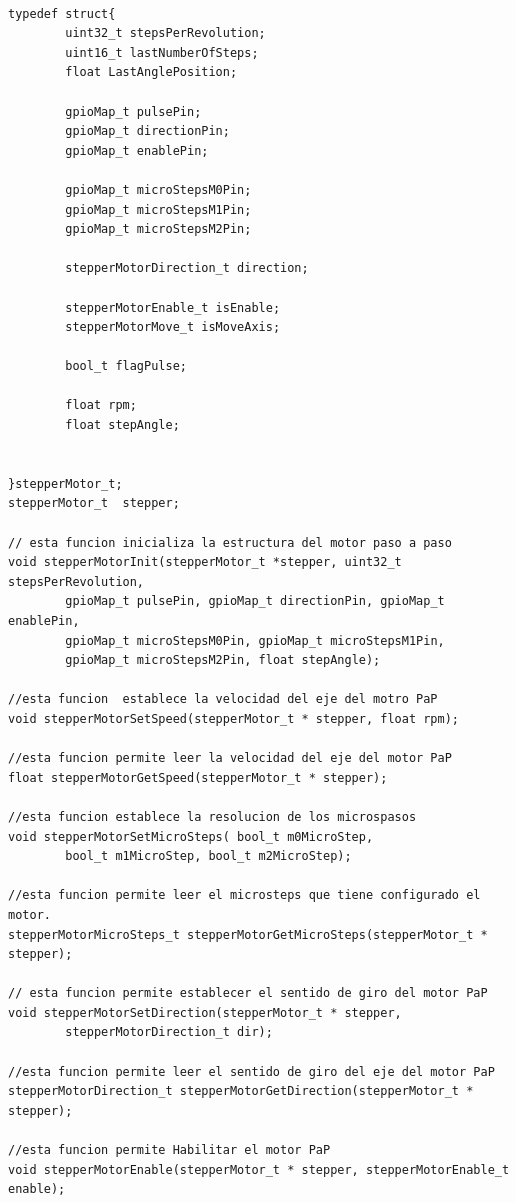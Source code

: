 \begin{lstlisting}[label=cod:vControl,caption=Porción de código del archivo de cabecera con la interfaz pública de la clase StepperMotor.]  % Start your code-block

typedef struct{
		uint32_t stepsPerRevolution;
		uint16_t lastNumberOfSteps;
		float LastAnglePosition;

		gpioMap_t pulsePin;
		gpioMap_t directionPin;
		gpioMap_t enablePin;

		gpioMap_t microStepsM0Pin;
		gpioMap_t microStepsM1Pin;
		gpioMap_t microStepsM2Pin;

		stepperMotorDirection_t direction;

		stepperMotorEnable_t isEnable;
		stepperMotorMove_t isMoveAxis;

		bool_t flagPulse;

		float rpm;
		float stepAngle;


}stepperMotor_t;
stepperMotor_t  stepper;

// esta funcion inicializa la estructura del motor paso a paso
void stepperMotorInit(stepperMotor_t *stepper, uint32_t stepsPerRevolution,
		gpioMap_t pulsePin, gpioMap_t directionPin, gpioMap_t enablePin,
		gpioMap_t microStepsM0Pin, gpioMap_t microStepsM1Pin,
		gpioMap_t microStepsM2Pin, float stepAngle);
		
//esta funcion  establece la velocidad del eje del motro PaP
void stepperMotorSetSpeed(stepperMotor_t * stepper, float rpm);

//esta funcion permite leer la velocidad del eje del motor PaP
float stepperMotorGetSpeed(stepperMotor_t * stepper);

//esta funcion establece la resolucion de los microspasos
void stepperMotorSetMicroSteps( bool_t m0MicroStep,
		bool_t m1MicroStep, bool_t m2MicroStep);

//esta funcion permite leer el microsteps que tiene configurado el motor.
stepperMotorMicroSteps_t stepperMotorGetMicroSteps(stepperMotor_t * stepper);

// esta funcion permite establecer el sentido de giro del motor PaP
void stepperMotorSetDirection(stepperMotor_t * stepper,
		stepperMotorDirection_t dir);

//esta funcion permite leer el sentido de giro del eje del motor PaP
stepperMotorDirection_t stepperMotorGetDirection(stepperMotor_t * stepper);

//esta funcion permite Habilitar el motor PaP
void stepperMotorEnable(stepperMotor_t * stepper, stepperMotorEnable_t enable);


\end{lstlisting}
